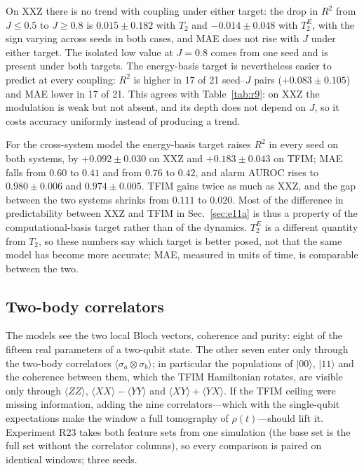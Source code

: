 \documentclass[twocolumn,10pt]{article}
\begin{document}
On XXZ there is no trend with coupling under either target: the drop in
$R^2$ from $J \le 0.5$ to $J \ge 0.8$ is $0.015 \pm 0.182$ with $T_2$
and $-0.014 \pm 0.048$ with $T_2^E$, with the sign varying across seeds
in both cases, and MAE does not rise with $J$ under either target.
The isolated low value at $J = 0.8$ comes from one seed and is present
under both targets.
The energy-basis target is nevertheless easier to predict at every
coupling: $R^2$ is higher in 17 of 21 seed--$J$ pairs
($+0.083 \pm 0.105$) and MAE lower in 17 of 21.
This agrees with Table~\ref{tab:r9}: on XXZ the modulation is weak but
not absent, and its depth does not depend on $J$, so it costs accuracy
uniformly instead of producing a trend.

For the cross-system model the energy-basis target raises $R^2$ in every
seed on both systems, by $+0.092 \pm 0.030$ on XXZ and
$+0.183 \pm 0.043$ on TFIM; MAE falls from $0.60$ to $0.41$ and from
$0.76$ to $0.42$, and alarm AUROC rises to $0.980 \pm 0.006$ and
$0.974 \pm 0.005$.
TFIM gains twice as much as XXZ, and the gap between the two systems
shrinks from $0.111$ to $0.020$.
Most of the difference in predictability between XXZ and TFIM in
Sec.~\ref{sec:e11a} is thus a property of the computational-basis
target rather than of the dynamics.
$T_2^E$ is a different quantity from $T_2$, so these numbers say which
target is better posed, not that the same model has become more
accurate; MAE, measured in units of time, is comparable between the
two.

\subsection{Two-body correlators}
\label{sec:r23}

The models see the two local Bloch vectors, coherence and purity: eight
of the fifteen real parameters of a two-qubit state. The other seven
enter only through the two-body correlators
$\langle\sigma_a\otimes\sigma_b\rangle$; in particular the populations of
$|00\rangle$, $|11\rangle$ and the coherence between them, which the
TFIM Hamiltonian rotates, are visible only through
$\langle ZZ\rangle$, $\langle XX\rangle - \langle YY\rangle$ and
$\langle XY\rangle + \langle YX\rangle$. If the TFIM ceiling were missing
information, adding the nine correlators---which with the single-qubit
expectations make the window a full tomography of $\rho(t)$---should
lift it. Experiment R23 takes both feature sets from one simulation (the
base set is the full set without the correlator columns), so every
comparison is paired on identical windows; three seeds.
\end{document}
